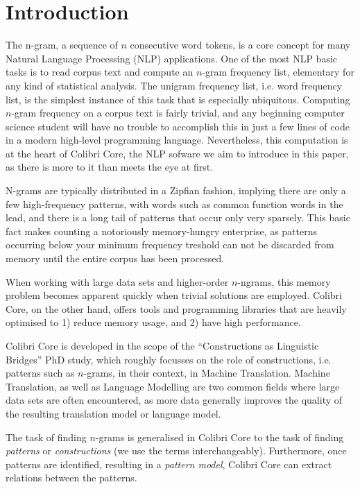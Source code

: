 



\section{Introduction}

The n-gram, a sequence of $n$ consecutive word tokens, is a core concept for
many Natural Language Processing (NLP) applications. One of the most NLP basic
tasks is to read corpus text and compute an $n$-gram frequency list, elementary
for any kind of statistical analysis. The unigram frequency list, i.e. word
frequency list, is the simplest instance of this task that is especially
ubiquitous. Computing $n$-gram frequency on a corpus text is fairly trivial,
and any beginning computer science student will have no trouble to accomplish
this in just a few lines of code in a modern high-level programming language.
Nevertheless, this computation is at the heart of Colibri Core, the NLP sofware
we aim to introduce in this paper, as there is more to it than meets the eye at
first.

N-grams are typically distributed in a Zipfian fashion, implying there are only
a few high-frequency patterns, with words such as common function words in the
lead, and there is a long tail of patterns that occur only very sparsely. This
basic fact makes counting a notoriously memory-hungry enterprise, as patterns
occurring below your minimum frequency treshold can not be discarded from
memory until the entire corpus has been processed. 

When working with large data sets and higher-order $n$-ngrams, this memory
problem becomes apparent quickly when trivial solutions are employed. Colibri
Core, on the other hand, offers tools and programming libraries that are
heavily optimised to 1) reduce memory usage, and 2) have high performance.

Colibri Core is developed in the scope of the ``Constructions as Linguistic
Bridges'' PhD study, which roughly focusses on the role of constructions, i.e.
patterns such as $n$-grams, in their context, in Machine Translation. Machine
Translation, as well as Language Modelling are two common fields where large
data sets are often encountered, as more data generally improves the quality of
the resulting translation model or language model. 


The task of finding $n$-grams is generalised in Colibri Core to the task of
finding \emph{patterns} or \emph{constructions} (we use the terms
interchangeably). Furthermore, once patterns are identified, resulting in a
\emph{pattern model}, Colibri Core can extract relations between the patterns.

